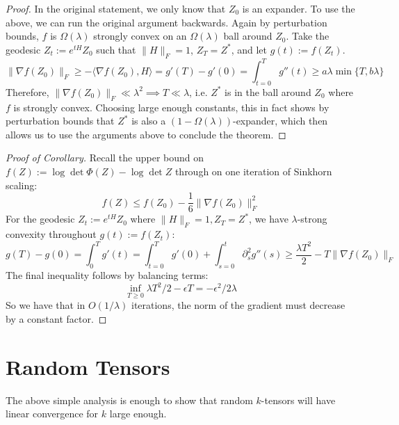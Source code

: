 \documentclass{article}
\begin{document}
\begin{proof}
In the original statement, we only know that $Z_{0}$ is an expander. To use the above, we can run the original argument backwards. Again by perturbation bounds, $f$ is $\Omega(\lambda)$ strongly convex on an $\Omega(\lambda)$ ball around $Z_{0}$. Take the geodesic $Z_{t} := e^{t H} Z_{0}$ such that $\|H\|_{F} =1$, $Z_{T} = Z^{*}$, and let $g(t) := f(Z_{t})$. 
\[ \|\nabla f(Z_{0})\|_{F} \geq - \langle \nabla f(Z_{0}), H \rangle = g'(T) - g'(0) = \int_{t=0}^{T} g''(t) \geq a \lambda \min\{T, b \lambda \}  \]
Therefore, $\|\nabla f(Z_{0})\|_{F} \ll \lambda^{2} \implies T \ll \lambda$, i.e. $Z^{*}$ is in the ball around $Z_{0}$ where $f$ is strongly convex. 
Choosing large enough constants, this in fact shows by perturbation bounds that $Z^{*}$ is also a $(1-\Omega(\lambda))$-expander, which then allows us to use the arguments above to conclude the theorem. 
\end{proof}

\begin{proof} [Proof of Corollary]
Recall the upper bound on $f(Z) := \log\det \Phi(Z) - \log \det Z$ through on one iteration of Sinkhorn scaling:
\[ f(Z) \leq f(Z_{0}) - \frac{1}{6} \|\nabla f(Z_{0})\|_{F}^{2}   \]
For the geodesic $Z_{t} := e^{tH} Z_{0}$ where $\|H\|_{F} = 1, Z_{T} = Z^{*}$, we have $\lambda$-strong convexity throughout $g(t) := f(Z_{t})$:
\[ g(T) - g(0) = \int_{0}^{T} g'(t) = \int_{t=0}^{T} g'(0) + \int_{s=0}^{t} \partial_{s}^{2} g''(s) \geq \frac{\lambda T^{2}}{2} - T \|\nabla f(Z_{0})\|_{F}  \]
The final inequality follows by balancing terms:
\[ \inf_{T \geq 0} \lambda T^{2}/2 - \epsilon T = - \epsilon^{2}/ 2 \lambda \]
So we have that in $O(1/\lambda)$ iterations, the norm of the gradient must decrease by a constant factor. 
\end{proof}

\section{Random Tensors}
The above simple analysis is enough to show that random $k$-tensors will have linear convergence for $k$ large enough. 
\end{document}
